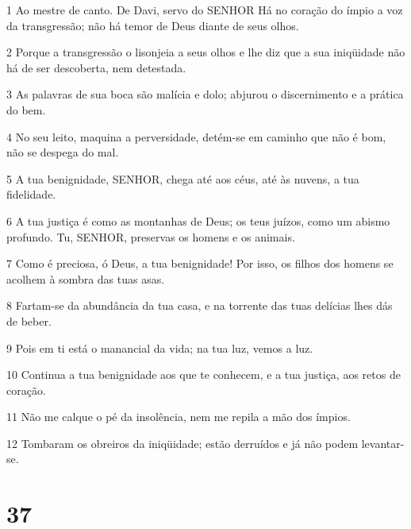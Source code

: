 \par 1 Ao mestre de canto. De Davi, servo do SENHOR Há no coração do ímpio a voz da transgressão; não há temor de Deus diante de seus olhos.
\par 2 Porque a transgressão o lisonjeia a seus olhos e lhe diz que a sua iniqüidade não há de ser descoberta, nem detestada.
\par 3 As palavras de sua boca são malícia e dolo; abjurou o discernimento e a prática do bem.
\par 4 No seu leito, maquina a perversidade, detém-se em caminho que não é bom, não se despega do mal.
\par 5 A tua benignidade, SENHOR, chega até aos céus, até às nuvens, a tua fidelidade.
\par 6 A tua justiça é como as montanhas de Deus; os teus juízos, como um abismo profundo. Tu, SENHOR, preservas os homens e os animais.
\par 7 Como é preciosa, ó Deus, a tua benignidade! Por isso, os filhos dos homens se acolhem à sombra das tuas asas.
\par 8 Fartam-se da abundância da tua casa, e na torrente das tuas delícias lhes dás de beber.
\par 9 Pois em ti está o manancial da vida; na tua luz, vemos a luz.
\par 10 Continua a tua benignidade aos que te conhecem, e a tua justiça, aos retos de coração.
\par 11 Não me calque o pé da insolência, nem me repila a mão dos ímpios.
\par 12 Tombaram os obreiros da iniqüidade; estão derruídos e já não podem levantar-se.

\chapter{37}

